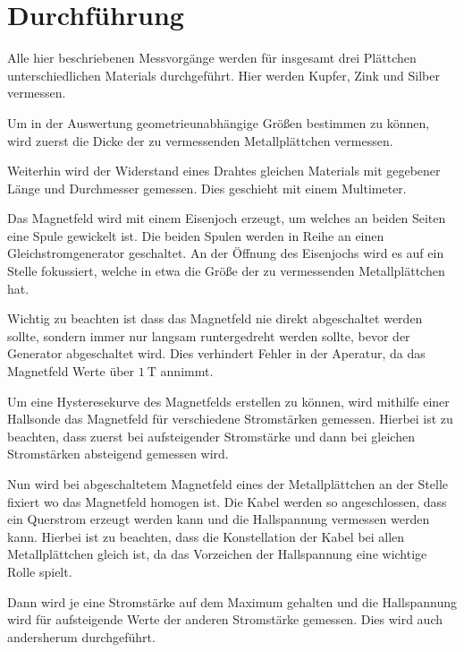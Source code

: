 \section{Durchführung}
\label{sec:Durchführung}


Alle hier beschriebenen Messvorgänge werden für insgesamt drei Plättchen unterschiedlichen Materials durchgeführt. 
Hier werden Kupfer, Zink und Silber vermessen.

Um in der Auswertung geometrieunabhängige Größen bestimmen zu können, wird zuerst die Dicke der zu vermessenden Metallplättchen vermessen.

Weiterhin wird der Widerstand eines Drahtes gleichen Materials mit gegebener Länge und Durchmesser gemessen.
Dies geschieht mit einem Multimeter.

Das Magnetfeld wird mit einem Eisenjoch erzeugt, um welches an beiden Seiten eine Spule gewickelt ist.
Die beiden Spulen werden in Reihe an einen Gleichstromgenerator geschaltet.
An der Öffnung des Eisenjochs wird es auf ein Stelle fokussiert, welche in etwa die Größe der zu vermessenden Metallplättchen hat.

Wichtig zu beachten ist dass das Magnetfeld nie direkt abgeschaltet werden sollte, sondern immer nur langsam runtergedreht werden sollte, bevor der Generator abgeschaltet wird. 
Dies verhindert Fehler in der Aperatur, da das Magnetfeld Werte über $\SI{1}{\tesla}$ annimmt.

Um eine Hysteresekurve des Magnetfelds erstellen zu können, wird mithilfe einer Hallsonde das Magnetfeld für verschiedene Stromstärken gemessen.
Hierbei ist zu beachten, dass zuerst bei aufsteigender Stromstärke und dann bei gleichen Stromstärken absteigend gemessen wird.

Nun wird bei abgeschaltetem Magnetfeld eines der Metallplättchen an der Stelle fixiert wo das Magnetfeld homogen ist.
Die Kabel werden so angeschlossen, dass ein Querstrom erzeugt werden kann und die Hallspannung vermessen werden kann. 
Hierbei ist zu beachten, dass die Konstellation der Kabel bei allen Metallplättchen gleich ist, da das Vorzeichen der Hallspannung eine wichtige Rolle spielt.

Dann wird je eine Stromstärke auf dem Maximum gehalten und die Hallspannung wird für aufsteigende Werte der anderen Stromstärke gemessen.
Dies wird auch andersherum durchgeführt.